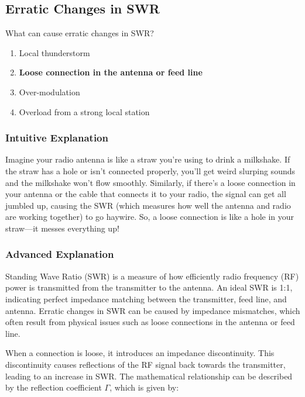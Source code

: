 \subsection{Erratic Changes in SWR}
\label{T9B09}

\begin{tcolorbox}[colback=gray!10!white,colframe=black!75!black,title=T9B09]
What can cause erratic changes in SWR?
\begin{enumerate}[label=\Alph*]
    \item Local thunderstorm
    \item \textbf{Loose connection in the antenna or feed line}
    \item Over-modulation
    \item Overload from a strong local station
\end{enumerate}
\end{tcolorbox}

\subsubsection{Intuitive Explanation}
Imagine your radio antenna is like a straw you're using to drink a milkshake. If the straw has a hole or isn't connected properly, you'll get weird slurping sounds and the milkshake won't flow smoothly. Similarly, if there's a loose connection in your antenna or the cable that connects it to your radio, the signal can get all jumbled up, causing the SWR (which measures how well the antenna and radio are working together) to go haywire. So, a loose connection is like a hole in your straw—it messes everything up!

\subsubsection{Advanced Explanation}
Standing Wave Ratio (SWR) is a measure of how efficiently radio frequency (RF) power is transmitted from the transmitter to the antenna. An ideal SWR is 1:1, indicating perfect impedance matching between the transmitter, feed line, and antenna. Erratic changes in SWR can be caused by impedance mismatches, which often result from physical issues such as loose connections in the antenna or feed line.

When a connection is loose, it introduces an impedance discontinuity. This discontinuity causes reflections of the RF signal back towards the transmitter, leading to an increase in SWR. The mathematical relationship can be described by the reflection coefficient \(\Gamma\), which is given by:

